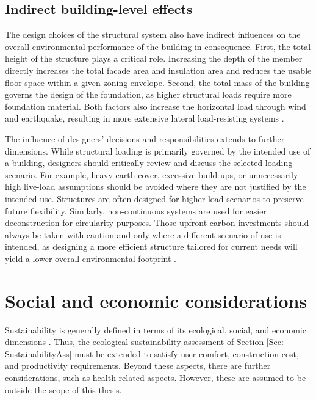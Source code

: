 \subsection{Indirect building-level effects \label{Sec: IndirectInfl}}

The design choices of the structural system also have indirect influences on the overall environmental performance of the building in consequence. First, the total height of the structure plays a critical role. Increasing the depth of the member directly increases the total facade area and insulation area and reduces the usable floor space within a given zoning envelope. Second, the total mass of the building governs the design of the foundation, as higher structural loads require more foundation material. Both factors also increase the horizontal load through wind and earthquake, resulting in more extensive lateral load-resisting systems \cite{Kaufmann2024_WhitePaper}.

The influence of designers’ decisions and responsibilities extends to further dimensions. While structural loading is primarily governed by the intended use of a building, designers should critically review and discuss the selected loading scenario. For example, heavy earth cover, excessive build-ups, or unnecessarily high live-load assumptions should be avoided where they are not justified by the intended use. Structures are often designed for higher load scenarios to preserve future flexibility. Similarly, non-continuous systems are used for easier deconstruction for circularity purposes.
Those upfront carbon investments should always be taken with caution and only where a different scenario of use is intended, as designing a more efficient structure tailored for current needs will yield a lower overall environmental footprint \cite{Kaufmann2024_WhitePaper}.



\section{Social and economic considerations}
Sustainability is generally defined in terms of its ecological, social, and economic dimensions \cite{Ammann2024}. Thus, the ecological sustainability assessment of Section \ref{Sec: SustainabilityAss} must be extended to satisfy user comfort, construction cost, and productivity requirements. Beyond these aspects, there are further considerations, such as health-related aspects. However, these are assumed to be outside the scope of this thesis.

